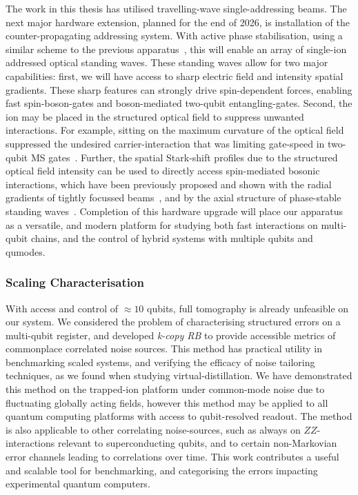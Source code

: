 The work in this thesis has utilised travelling-wave single-addressing beams. The next major hardware extension, planned for the end of 2026, is installation of the counter-propagating addressing system. With active phase stabilisation, using a similar scheme to the previous apparatus~\cite{bazavan_easy_2024}, this will enable an array of single-ion addressed optical standing waves. These standing waves allow for two major capabilities: first, we will have access to sharp electric field and intensity spatial gradients. These sharp features can strongly drive spin-dependent forces, enabling fast spin-boson-gates and boson-mediated two-qubit entangling-gates. Second, the ion may be placed in the structured optical field to suppress unwanted interactions. For example, sitting on the maximum curvature of the optical field suppressed the undesired carrier-interaction that was limiting gate-speed in two-qubit MS gates~\cite{saner_breaking_2023}. Further, the spatial Stark-shift profiles due to the structured optical field intensity can be used to directly access spin-mediated bosonic interactions, which have been previously proposed and shown with the radial gradients of tightly focussed beams~\cite{leindecker_state-dependent_2026}, and by the axial structure of phase-stable standing waves~\cite{drechsler_state-dependent_2020,vasquez_control_2023}. Completion of this hardware upgrade will place our apparatus as a versatile, and modern platform for studying both fast interactions on multi-qubit chains, and the control of hybrid systems with multiple qubits and qumodes.


\subsubsection{Scaling Characterisation}
With access and control of $\approx 10$ qubits, full tomography is already unfeasible on our system. We considered the problem of characterising structured errors on a multi-qubit register, and
developed \emph{k-copy RB} to provide accessible metrics of commonplace correlated noise sources. This method has practical utility in benchmarking scaled systems, and verifying the efficacy of noise tailoring techniques, as we found when studying virtual-distillation. We have demonstrated this method on the trapped-ion platform under common-mode noise due to fluctuating globally acting fields, however this method may be applied to all quantum computing platforms with access to qubit-resolved readout. The method is also applicable to other correlating noise-sources, such as always on $ZZ$-interactions relevant to superconducting qubits, and to certain non-Markovian error channels leading to correlations over time. 
This work contributes a useful and scalable tool for benchmarking, and categorising the errors impacting experimental quantum computers.

